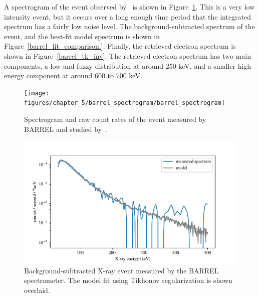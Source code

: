 A spectrogram of the event observed by~\citet{Halford2015} is shown in Figure~\ref{barrel_spectrogram}. This is a very low intensity event, but it occurs over a long enough time period that the integrated spectrum has a fairly low noise level. The background-subtracted spectrum of the event, and the best-fit model spectrum is shown in Figure~\ref{barrel_fit_comparison.}. Finally, the retrieved electron spectrum is shown in Figure~\ref{barrel_tk_inv}. The retrieved electron spectrum has two main components, a low and fuzzy distribution at around 250 keV, and a smaller high energy component at around 600 to 700 keV. 

\begin{figure}[h]
    \centering
    \texttt{[image: figures/chapter\_5/barrel\_spectrogram/barrel\_spectrogram]}
    \caption{Spectrogram and raw count rates of the event measured by BARREL and studied by~\citet{Halford2015}.}
    \label{barrel_spectrogram}
\end{figure}

\begin{figure}[h]
    \centering
    \includegraphics[width=1.0\textwidth]{figures/chapter_5/barrel_fit_comparison/barrel_fit_comparison}
    \caption{Background-subtracted X-ray event measured by the BARREL spectrometer. The model fit using Tikhonov regularization is shown overlaid.}
    \label{barrel_fit_comparison}
\end{figure}

